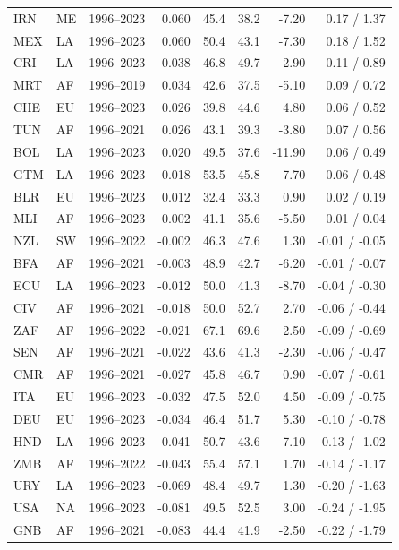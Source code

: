 \begin{table}[H]
\begin{threeparttable}
\begin{tabular}{llrrrrrr}
IRN & ME & 1996--2023 & 0.060 & 45.4 & 38.2 & -7.20 & 0.17 / 1.37 \\
MEX & LA & 1996--2023 & 0.060 & 50.4 & 43.1 & -7.30 & 0.18 / 1.52 \\
CRI & LA & 1996--2023 & 0.038 & 46.8 & 49.7 & 2.90 & 0.11 / 0.89 \\
MRT & AF & 1996--2019 & 0.034 & 42.6 & 37.5 & -5.10 & 0.09 / 0.72 \\
CHE & EU & 1996--2023 & 0.026 & 39.8 & 44.6 & 4.80 & 0.06 / 0.52 \\
TUN & AF & 1996--2021 & 0.026 & 43.1 & 39.3 & -3.80 & 0.07 / 0.56 \\
BOL & LA & 1996--2023 & 0.020 & 49.5 & 37.6 & -11.90 & 0.06 / 0.49 \\
GTM & LA & 1996--2023 & 0.018 & 53.5 & 45.8 & -7.70 & 0.06 / 0.48 \\
BLR & EU & 1996--2023 & 0.012 & 32.4 & 33.3 & 0.90 & 0.02 / 0.19 \\
MLI & AF & 1996--2023 & 0.002 & 41.1 & 35.6 & -5.50 & 0.01 / 0.04 \\
NZL & SW & 1996--2022 & -0.002 & 46.3 & 47.6 & 1.30 & -0.01 / -0.05 \\
BFA & AF & 1996--2021 & -0.003 & 48.9 & 42.7 & -6.20 & -0.01 / -0.07 \\
ECU & LA & 1996--2023 & -0.012 & 50.0 & 41.3 & -8.70 & -0.04 / -0.30 \\
CIV & AF & 1996--2021 & -0.018 & 50.0 & 52.7 & 2.70 & -0.06 / -0.44 \\
ZAF & AF & 1996--2022 & -0.021 & 67.1 & 69.6 & 2.50 & -0.09 / -0.69 \\
SEN & AF & 1996--2021 & -0.022 & 43.6 & 41.3 & -2.30 & -0.06 / -0.47 \\
CMR & AF & 1996--2021 & -0.027 & 45.8 & 46.7 & 0.90 & -0.07 / -0.61 \\
ITA & EU & 1996--2023 & -0.032 & 47.5 & 52.0 & 4.50 & -0.09 / -0.75 \\
DEU & EU & 1996--2023 & -0.034 & 46.4 & 51.7 & 5.30 & -0.10 / -0.78 \\
HND & LA & 1996--2023 & -0.041 & 50.7 & 43.6 & -7.10 & -0.13 / -1.02 \\
ZMB & AF & 1996--2022 & -0.043 & 55.4 & 57.1 & 1.70 & -0.14 / -1.17 \\
URY & LA & 1996--2023 & -0.069 & 48.4 & 49.7 & 1.30 & -0.20 / -1.63 \\
USA & NA & 1996--2023 & -0.081 & 49.5 & 52.5 & 3.00 & -0.24 / -1.95 \\
GNB & AF & 1996--2021 & -0.083 & 44.4 & 41.9 & -2.50 & -0.22 / -1.79 \\

\end{tabular}
\end{threeparttable}
\end{table}
